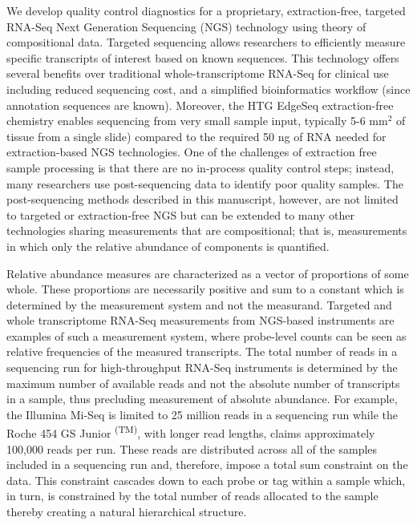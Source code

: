 
We develop quality control diagnostics for a proprietary, extraction-free,  targeted RNA-Seq Next Generation Sequencing (NGS) technology using theory of compositional data.  Targeted sequencing allows researchers to efficiently measure specific transcripts of interest based on known sequences.  This technology offers several benefits over traditional whole-transcriptome RNA-Seq for clinical use including reduced sequencing cost, and a simplified bioinformatics workflow (since annotation sequences are known).  Moreover, the HTG EdgeSeq extraction-free chemistry  enables sequencing from very small sample input, typically 5-6 mm$^2$ of tissue from a single slide) compared to the required 50 ng of RNA needed for extraction-based NGS technologies. One of the challenges of extraction free  sample processing is that there are no in-process quality control steps; instead, many researchers use post-sequencing data to identify poor quality samples. The post-sequencing methods described in this manuscript, however, are not limited to targeted or extraction-free NGS but can be extended to many other technologies sharing measurements that are compositional; that is, measurements in which only the relative abundance of components is quantified.


Relative abundance measures are characterized as a vector of proportions of some whole.  These proportions are necessarily positive and sum to a constant which is determined by the measurement system and not the measurand.  
Targeted and whole transcriptome RNA-Seq measurements from NGS-based instruments are examples of such a measurement system, where probe-level counts can be seen as relative frequencies of the measured transcripts.   The total number of reads in a sequencing run for high-throughput RNA-Seq instruments is determined by the maximum number of available reads and not the absolute number of transcripts in a sample, thus precluding measurement of absolute abundance.  For example, the Illumina Mi-Seq is limited to 25 million reads in a sequencing run while the Roche 454 GS Junior \textsuperscript{(TM)}, with longer read lengths, claims approximately 100,000 reads per run.  These reads are distributed across all of the samples included in a sequencing run and, therefore, impose a total sum constraint on the data.  This constraint cascades down to each probe or tag within a sample which, in turn, is constrained by the total number of reads allocated to the sample thereby creating a natural hierarchical structure.

